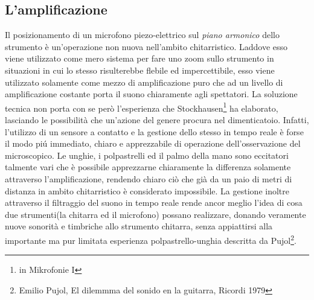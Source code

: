 \documentclass[oneside]{article}
\begin{document}
\begin{multicols*}{2}
\subsection{L'amplificazione} 
Il posizionamento di un microfono piezo-elettrico sul \textit{piano armonico} dello strumento è un'operazione non nuova nell'ambito chitarristico. Laddove esso viene utilizzato come mero sistema per fare uno zoom sullo strumento in situazioni in cui lo stesso risulterebbe flebile ed impercettibile, esso viene utilizzato solamente come mezzo di amplificazione puro che ad un livello di amplificazione costante porta il suono chiaramente agli spettatori. La soluzione tecnica non porta con se però l'esperienza che Stockhausen\footnote{in Mikrofonie I} ha elaborato, lasciando le possibilità che un'azione del genere procura nel dimenticatoio. Infatti, l'utilizzo di un sensore a contatto e la gestione dello stesso in tempo reale è forse il modo piú immediato, chiaro e apprezzabile di operazione dell'osservazione del microscopico.
Le unghie, i polpastrelli ed il palmo della mano sono eccitatori talmente vari che è possibile apprezzarne chiaramente la differenza solamente attraverso l'amplificazione, rendendo chiaro ciò che già da un paio di metri di distanza in ambito chitarristico è considerato impossibile. La gestione inoltre attraverso il filtraggio del suono in tempo reale rende ancor meglio l'idea di cosa due strumenti(la chitarra ed il microfono) possano realizzare, donando veramente nuove sonorità e timbriche allo strumento chitarra, senza appiattirsi alla importante ma pur limitata esperienza polpastrello-unghia descritta da Pujol\footnote{Emilio Pujol, El dilemmma del sonido en la guitarra, Ricordi 1979}.


\end{multicols*}
\end{document}
